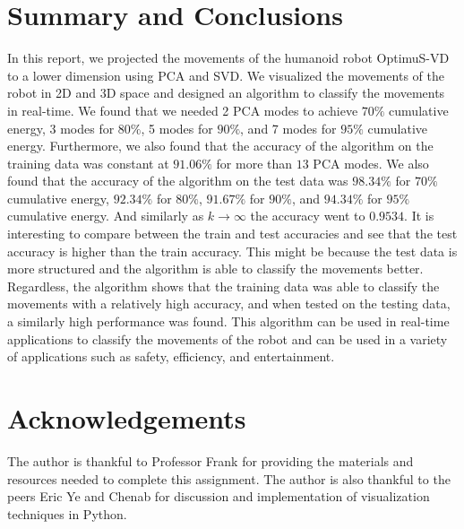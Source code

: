 \documentclass[11pt]{amsart}
\begin{document}
\section{Summary and Conclusions}\label{sec:Conclusions}


In this report, we projected the movements of the humanoid robot OptimuS-VD to a lower dimension using PCA and SVD. We visualized the movements of the robot in 2D and 3D space and designed an algorithm to classify the movements in real-time. We found that we needed 2 PCA modes to achieve $70\%$ cumulative energy, 3 modes for $80\%$, 5 modes for $90\%$, and 7 modes for $95\%$ cumulative energy. Furthermore, we also found that the accuracy of the algorithm on the training data was constant at $91.06\%$ for more than $13$ PCA modes. We also found that the accuracy of the algorithm on the test data was $98.34\%$ for $70\%$ cumulative energy, $92.34\%$ for $80\%$, $91.67\%$ for $90\%$, and $94.34\%$ for $95\%$ cumulative energy. And similarly as $k \to \infty$ the accuracy went to $0.9534$. It is interesting to compare between the train and test accuracies and see that the test accuracy is higher than the train accuracy. This might be because the test data is more structured and the algorithm is able to classify the movements better. Regardless, the algorithm shows that the training data was able to classify the movements with a relatively high accuracy, and when tested on the testing data, a similarly high performance was found. This algorithm can be used in real-time applications to classify the movements of the robot and can be used in a variety of applications such as safety, efficiency, and entertainment.


\section*{Acknowledgements}

The author is thankful to Professor Frank for providing the materials and resources needed to complete this assignment. The author is also thankful to the peers Eric Ye and Chenab for discussion and implementation of visualization techniques in Python.



\end{document}
